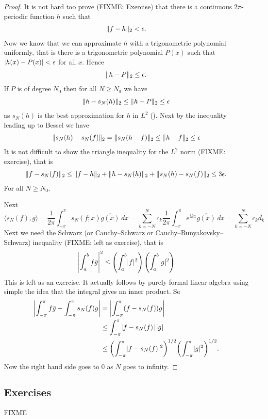 \begin{proof}
It is not hard too prove (FIXME: Exercise) that there is
a continuous $2\pi$-periodic function $h$ such that
\begin{equation*}
\lVert {f-h} \rVert_2 < \epsilon .
\end{equation*}
Now we know that we can approximate $h$ with a trigonometric polynomial
uniformly, that is there is a trigonometric polynomial $P(x)$
such that
$\lvert {h(x) - P(x)} \rvert < \epsilon$ for all $x$.
Hence
\begin{equation*}
\lVert {h-P} \rVert_2 \leq \epsilon.
\end{equation*}
If $P$ is of degree $N_0$ then for all $N \geq N_0$ we have
\begin{equation*}
\lVert {h-s_N(h)} \rVert_2 \leq \lVert {h-P} \rVert_2 \leq \epsilon
\end{equation*}
as $s_N(h)$ is the best approximation for $h$ in $L^2$ ().
Next by the inequality leading up to Bessel we have
\begin{equation*}
\lVert {s_N(h)-s_N(f)} \rVert_2
=
\lVert {s_N(h-f)} \rVert_2
\leq
\lVert {h-f} \rVert_2 \leq \epsilon
\end{equation*}
It is not difficult to show the triangle
inequality for the $L^2$ norm (FIXME: exercise), that is
\begin{equation*}
\lVert {f-s_N(f)} \rVert_2
\leq
\lVert {f-h} \rVert_2
+
\lVert {h-s_N(h)} \rVert_2
+
\lVert {s_N(h)-s_N(f)} \rVert_2
\leq 3\epsilon .
\end{equation*}
For all $N \geq N_0$.

Next
\begin{equation*}
\langle s_N(f) , g \rangle
=
\frac{1}{2\pi}
\int_{-\pi}^\pi
s_N(f;x) \overline{g(x)} ~ dx
=
\sum_{k=-N}^N
c_k 
\frac{1}{2\pi}
\int_{-\pi}^\pi
e^{ikx}
\overline{g(x)} ~ dx
=
\sum_{k=-N}^N
c_k 
\overline{d_k}
\end{equation*}
Next we need the Schwarz (or Cauchy--Schwarz or Cauchy--Bunyakovsky--Schwarz)
inequality (FIXME: left as exercise), that is
\begin{equation*}
{\left\lvert {\int_a^b f\bar{g}} \right\rvert}^2
\leq
\left( \int_a^b \lvert {f} \rvert^2 \right)
\left( \int_a^b \lvert {g} \rvert^2 \right)
\end{equation*}
This is left as an exercise.  It actually follows by purely formal
linear algebra using simple the idea that the integral gives an inner
product.
So
\begin{equation*}
\begin{split}
\left\lvert {\int_{-\pi}^\pi f\bar{g} - \int_{-\pi}^\pi s_N(f)g} \right\rvert
& =
\left\lvert {\int_{-\pi}^\pi (f- s_N(f))g} \right\rvert \\
& \leq
\int_{-\pi}^\pi \lvert {f- s_N(f)} \rvert\, \lvert {g} \rvert \\
& \leq
{\left(\int_{-\pi}^\pi \lvert {f- s_N(f)} \rvert^2 \right)}^{1/2}
{\left( \int_{-\pi}^\pi \lvert {g} \rvert^2 \right)}^{1/2} .
\end{split}
\end{equation*}
Now the right hand side goes to 0 as $N$ goes to infinity.
\end{proof}

\subsection{Exercises}

\begin{exercise}
FIXME
\end{exercise}


